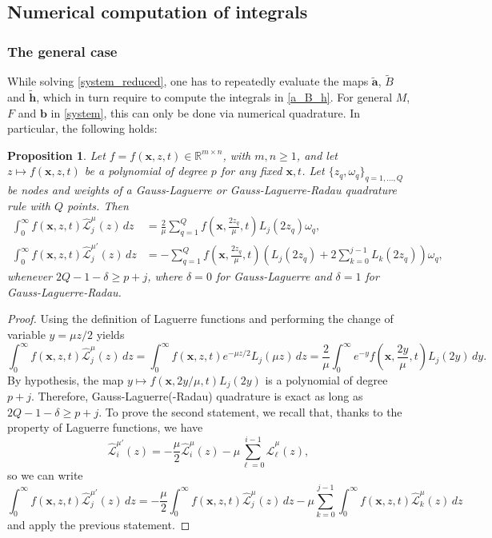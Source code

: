 \documentclass{article}
\newcommand{\Rbb}{\mathbb{R}}
\newcommand{\bbf}{\mathbf{b}}
\newcommand{\xbf}{\mathbf{x}}
\newcommand{\atbf}{\widetilde{\mathbf{a}}}
\newcommand{\Btbf}{\widetilde{B}}
\newcommand{\htbf}{\widetilde{\mathbf{h}}}
\newcommand{\cLh}{\hat{\mathscr{L}}}
\newtheorem{proposition}[theorem]{Proposition}
\begin{document}
	\subsection*{Numerical computation of integrals}
	\subsubsection*{The general case}
	While solving \eqref{system_reduced}, one has to repeatedly evaluate the maps $\atbf$, $\Btbf$ and $\htbf$, which in turn require to compute the integrals in \eqref{a_B_h}. For general $M$, $F$ and $\bbf$ in \eqref{system}, this can only be done via numerical quadrature. In particular, the following holds:
	\begin{proposition}\label{prop:int_general}
		Let $f=f(\xbf,z,t)\in\Rbb^{m\times n}$, with $m,n\geq 1$, and let $z\mapsto f(\xbf,z,t)$ be a polynomial of degree $p$ for any fixed $\xbf,t$. Let $\{z_q,\omega_q\}_{q=1,\dots,Q}$ be nodes and weights of a Gauss-Laguerre or Gauss-Laguerre-Radau quadrature rule with $Q$ points. Then
		\begin{align*}
			\int_0^\infty f(\xbf,z,t)\cLh_j^\mu(z)\,dz &= \frac{2}{\mu}\sum_{q=1}^Qf\left(\xbf,\frac{2z_q}{\mu},t\right)L_j(2z_q)\omega_q, \\
			\int_0^\infty f(\xbf,z,t)\cLh_j^{\mu\prime}(z)\,dz &=  -\sum_{q=1}^Qf\left(\xbf,\frac{2z_q}{\mu},t\right)\left(L_j(2z_q)+2\sum_{k=0}^{j-1}L_k(2z_q)\right)\omega_q,
		\end{align*}
		whenever $2Q-1-\delta\geq p+j$, where $\delta=0$ for Gauss-Laguerre and $\delta=1$ for Gauss-Laguerre-Radau.
	\end{proposition}
	\begin{proof}
		Using the definition of Laguerre functions and performing the change of variable $y=\mu z/2$ yields
		\begin{equation*}
			\int_0^\infty f(\xbf,z,t)\cLh_j^\mu(z)\,dz = \int_0^\infty f(\xbf,z,t)e^{-\mu z/2}L_j(\mu z)\,dz = \frac{2}{\mu}\int_0^\infty e^{-y} f\left(\xbf,\frac{2y}{\mu},t\right)L_j(2y)\,dy.
		\end{equation*}
		By hypothesis, the map $y\mapsto f\left(\xbf,2y/\mu,t\right)L_j(2y)$ is a polynomial of degree $p+j$. Therefore, Gauss-Laguerre(-Radau) quadrature is exact as long as $2Q-1-\delta\geq p+j$. To prove the second statement, we recall that, thanks to the property of Laguerre functions, we have
		\begin{equation*}
			\cLh_i^{\mu\prime}(z) = -\frac{\mu}{2}\cLh_i^\mu(z)-\mu\sum_{\ell=0}^{i-1}\cLh_\ell^\mu(z),
		\end{equation*}
		so we can write
		\begin{equation*}
			\int_0^\infty f(\xbf,z,t)\cLh_j^{\mu\prime}(z)\,dz = -\frac{\mu}{2}\int_0^\infty f(\xbf,z,t)\cLh_j^\mu(z)\,dz-\mu\sum_{k=0}^{j-1}\int_0^\infty f(\xbf,z,t)\cLh_k^\mu(z)\,dz
		\end{equation*}
		and apply the previous statement.
	\end{proof}
\end{document}
